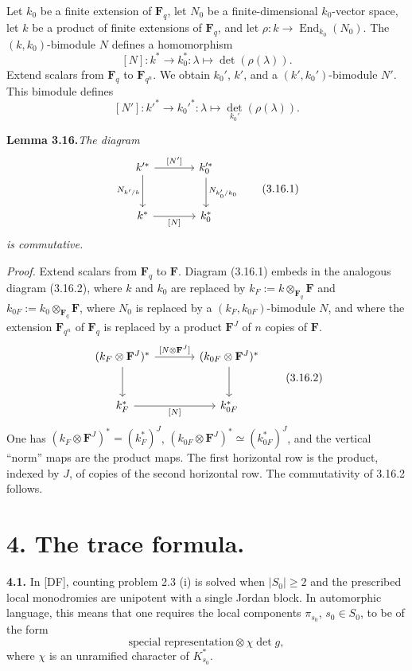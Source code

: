 \documentclass[11pt]{article}
\newcommand{\Fq}{\mathbf{F}_q}
\newcommand{\Fqn}{\mathbf{F}_{q^n}}
\newcommand{\F}{\mathbf{F}}
\newcommand{\End}{\operatorname{End}}
\newcommand{\para}[1]{\medskip\noindent\textbf{#1}\enspace}
\begin{document}
Let \(k_0\) be a finite extension of \(\Fq\), let \(N_0\) be a finite-dimensional \(k_0\)-vector space, let \(k\) be a product of finite extensions of \(\Fq\), and let \(\rho:k\to\End_{k_0}(N_0)\). The \((k,k_0)\)-bimodule \(N\) defines a homomorphism
\[
  [N]:k^*\longrightarrow k_0^*:\lambda\longmapsto\det(\rho(\lambda)).
\]
Extend scalars from \(\Fq\) to \(\Fqn\). We obtain \(k_0'\), \(k'\), and a \((k',k_0')\)-bimodule \(N'\). This bimodule defines
\[
  [N']:k'^*\longrightarrow k_0'^*:\lambda\longmapsto\det_{k_0'}(\rho(\lambda)).
\]

\noindent\textbf{Lemma 3.16.}\quad\textit{The diagram}
\begin{equation}
\begin{tikzcd}[column sep=large,row sep=large]
{k'^*} \arrow[r,"{[N']}" ] \arrow[d,"{N_{k'/k}}"'] & {k_0'^*} \arrow[d,"{N_{k_0'/k_0}}"] \\
{k^*} \arrow[r,"{[N]}"'] & {k_0^*}
\end{tikzcd}
\tag{3.16.1}
\end{equation}
\textit{is commutative.}

\textit{Proof.} Extend scalars from \(\Fq\) to \(\F\). Diagram (3.16.1) embeds in the analogous diagram (3.16.2), where \(k\) and \(k_0\) are replaced by \(k_F:=k\otimes_{\Fq}\F\) and \(k_{0F}:=k_0\otimes_{\Fq}\F\), where \(N_0\) is replaced by a \((k_F,k_{0F})\)-bimodule \(N\), and where the extension \(\Fqn\) of \(\Fq\) is replaced by a product \(\F^J\) of \(n\) copies of \(\F\).
\begin{equation}
\begin{tikzcd}[column sep=large,row sep=large]
{(k_F\otimes\F^J)^*} \arrow[r,"{[N\otimes\F^J]}"] \arrow[d] & {(k_{0F}\otimes\F^J)^*} \arrow[d] \\
{k_F^*} \arrow[r,"{[N]}"'] & {k_{0F}^*}
\end{tikzcd}
\tag{3.16.2}
\end{equation}
One has \((k_F\otimes\F^J)^*=(k_F^*)^J\), \((k_{0F}\otimes\F^J)^*\simeq(k_{0F}^*)^J\), and the vertical ``norm'' maps are the product maps. The first horizontal row is the product, indexed by \(J\), of copies of the second horizontal row. The commutativity of 3.16.2 follows.



\section*{4. The trace formula.}

\para{4.1.} In [DF], counting problem 2.3 (i) is solved when \(|S_0|\geq 2\) and the prescribed local monodromies are unipotent with a single Jordan block. In automorphic language, this means that one requires the local components \(\pi_{s_0}\), \(s_0\in S_0\), to be of the form
\begin{equation}
  \text{special representation}\otimes \chi\det g,
\tag{4.1.1}
\end{equation}
where \(\chi\) is an unramified character of \(K_{s_0}^*\).
\end{document}

